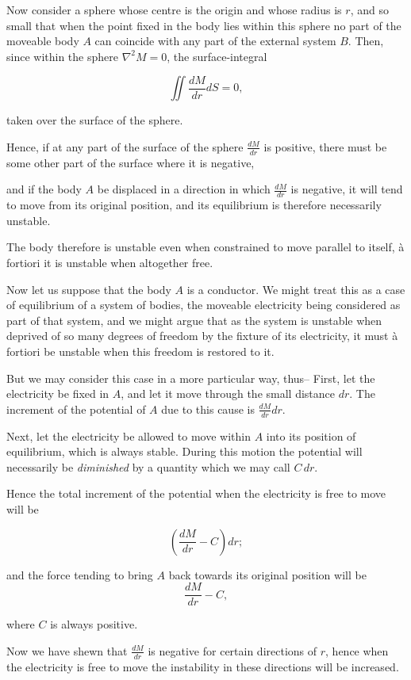 \documentclass[11pt,a4paper]{article}
\begin{document}
Now consider a sphere whose centre is the origin and whose radius is $r$, and so small that when the point fixed in the body lies within this sphere no part of the moveable body $A$ can coincide with any part of the external system $B$. Then, since within the sphere $\nabla^2M=0$, the surface-integral

\[
\iint \frac{dM}{dr}dS = 0,
\]

taken over the surface of the sphere.

Hence, if at any part of the surface of the sphere  $\frac{dM}{dr}$  is positive, there must be some other part of the surface where it is negative,

\setcounter{footnote}{0}
and if the body $A$ be displaced in a direction in which $\frac{dM}{dr}$ is negative, it will tend to move from its original position, and its equilibrium is therefore necessarily unstable.

The body therefore is unstable even when constrained to move parallel to itself, \`a fortiori it is unstable when altogether free.

Now let us suppose that the body $A$ is a conductor. We might treat this as a case of equilibrium of a system of bodies, the moveable electricity being considered as part of that system, and we might argue that as the system is unstable when deprived of so many degrees of freedom by the fixture of its electricity, it must \`a fortiori be unstable when this freedom is restored to it.

But we may consider this case in a more particular way, thus--
First, let the electricity be fixed in $A$, and let it move through the small distance $dr$. The increment of the potential of $A$ due to this cause is $\frac{dM}{dr}dr$.

Next, let the electricity be allowed to move within $A$ into its position of equilibrium, which is always stable. During this motion the potential will necessarily be \emph{diminished} by a quantity which we may call $C\,dr$.

Hence the total increment of the potential when the electricity is free to move will be

\[
\left(\frac{dM}{dr}-C\right)dr;
\]

and the force tending to bring $A$ back towards its original position will be
\[
\frac{dM}{dr}-C,
\]

where $C$ is always positive.

Now we have shewn that $\frac{dM}{dr}$ is negative for certain directions of $r$, hence when the electricity is free to move the instability in these directions will be increased.
\end{document}
